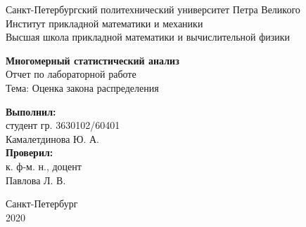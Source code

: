 \begin{titlepage}

\begin{center}
\large{Санкт-Петербургский политехнический университет Петра Великого\\
Институт прикладной математики и механики\\
Высшая школа прикладной математики и вычислительной физики\\}
\end{center}


\vspace{4cm}

\begin{center}
{\huge {\textbf{Многомерный статистический анализ}}}\\

\bigskip 
\large{{Отчет по лабораторной работе} \\
Тема: {Оценка закона распределения}}
\end{center}

\vspace{2.5cm}

\begin{flushleft}
    \begin{minipage}{0.35\textwidth}
        \textbf{Выполнил:} \\
        студент гр. 3630102/60401 \\ {Камалетдинова Ю. А.} \\ 

        \vspace{0.5cm} 
        \textbf{Проверил:} \\
        к. ф-м. н., доцент \\ {Павлова Л. В.}
        \vspace{1cm}
    \end{minipage}

\end{flushleft}

\vspace{0.5cm}

\begin{center}
Санкт-Петербург\\
2020
\end{center}

\end{titlepage}
